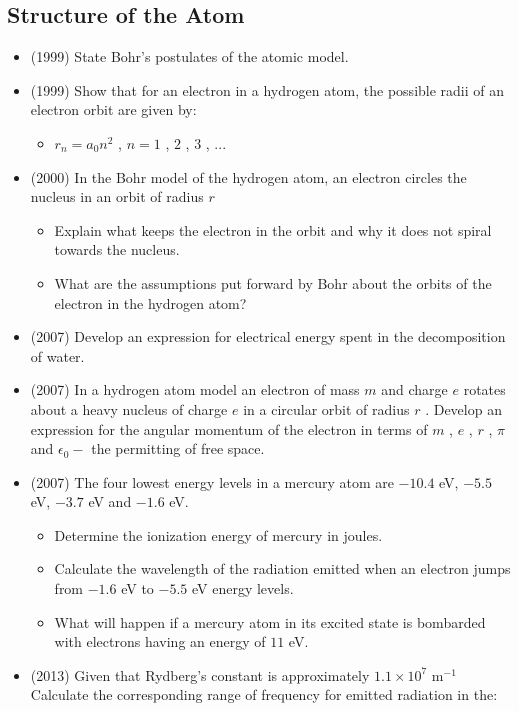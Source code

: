 \documentclass{article}
\begin{document}
\subsection{Structure of the Atom}
\begin{itemize}
\item (1999)  State Bohr’s postulates of the atomic model.
\item (1999)  Show that for an electron in a hydrogen atom, the possible radii of an electron orbit are given by:\begin{itemize}
\item $ r_{n}=a_{0}n^{2}$ , $ n=1$ , $ 2$ , $ 3$ , ...
\end{itemize}
\item (2000)  In the Bohr model of the hydrogen atom, an electron circles the nucleus in an orbit of radius $ r$\begin{itemize}
\item Explain what keeps the electron in the orbit and why it does not spiral towards the nucleus.
\item What are the assumptions put forward by Bohr about the orbits of the electron in the hydrogen atom?
\end{itemize}
\item (2007)  Develop an expression for electrical energy spent in the decomposition of water. 
\item (2007)  In a hydrogen atom model an electron of mass $ m$ and charge $ e$ rotates about a heavy nucleus of charge $ e$ in a circular orbit of radius $ r$ . Develop an expression for the angular momentum of the electron in terms of $ m$ , $ e$ , $ r$ , $ \pi$ and $ \epsilon  _{0}-$ the permitting of free space.
\item (2007)  The four lowest energy levels in a mercury atom are $ -10.4$ eV, $ -5.5$ eV, $ -3.7$ eV and $ -1.6$ eV.\begin{itemize}
\item Determine the ionization energy of mercury in joules. 
\item Calculate the wavelength of the radiation emitted when an electron jumps from $ -1.6$ eV to $ -5.5$ eV energy levels. 
\item What will happen if a mercury atom in its excited state is bombarded with electrons having an energy of $ 11$ eV. 
\end{itemize}
\item (2013)  Given that Rydberg’s constant is approximately $ 1.1 \times 10^{7}$ m$ ^{-1}$ Calculate the corresponding range of frequency for emitted radiation in the:\begin{itemize}

\end{itemize}
\end{itemize}
\end{document}
